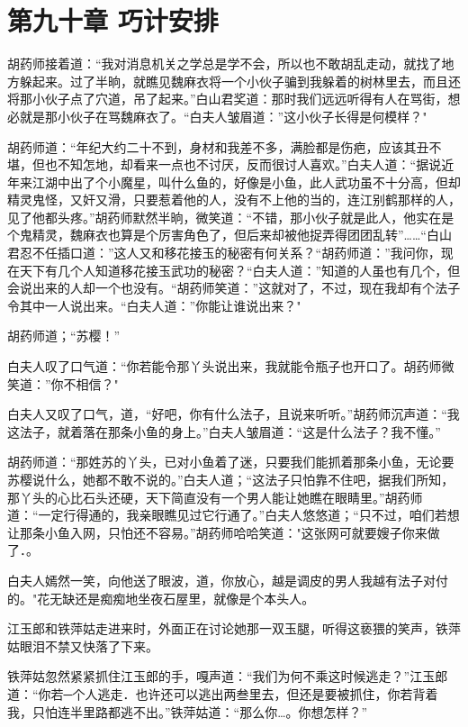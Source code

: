 \documentclass[12pt,oneside]{book}
\begin{document}
\hypertarget{ux7b2cux4e5dux5341ux7ae0-ux5de7ux8ba1ux5b89ux6392}{%
\chapter{第九十章
巧计安排}\label{ux7b2cux4e5dux5341ux7ae0-ux5de7ux8ba1ux5b89ux6392}}

胡药师接着道：``我对消息机关之学总是学不会，所以也不敢胡乱走动，就找了地方躲起来。过了半晌，就瞧见魏麻衣将一个小伙子骗到我躲着的树林里去，而且还将那小伙子点了穴道，吊了起来。''白山君奖道：那时我们远远听得有人在骂街，想必就是那小伙子在骂魏麻衣了。``白夫人皱眉道：''这小伙子长得是何模样？"

胡药师道：``年纪大约二十不到，身材和我差不多，满脸都是伤疤，应该其丑不堪，但也不知怎地，却看来一点也不讨厌，反而很讨人喜欢。''白夫人道：``据说近年来江湖中出了个小魔星，叫什么鱼的，好像是小鱼，此人武功虽不十分高，但却精灵鬼怪，又奸又滑，只要惹着他的人，没有不上他的当的，连江别鹤那样的人，见了他都头疼。''胡药师默然半晌，微笑道：``不错，那小伙子就是此人，他实在是个鬼精灵，魏麻衣也算是个厉害角色了，但后来却被他捉弄得团团乱转''\ldots\ldots{}``白山君忍不任插口道：''这人又和移花接玉的秘密有何关系？``胡药师道：''我问你，现在天下有几个人知道移花接玉武功的秘密？``白夫人道：''知道的人虽也有几个，但会说出来的人却一个也没有。``胡药师笑道：''这就对了，不过，现在我却有个法子令其中一人说出来。``白夫人道：''你能让谁说出来？"

胡药师道；``苏樱！''

白夫人叹了口气道：``你若能令那丫头说出来，我就能令瓶子也开口了。胡药师微笑道：''你不相信？"

白夫人又叹了口气，道，``好吧，你有什么法子，且说来听听。''胡药师沉声道：``我这法子，就着落在那条小鱼的身上。''白夫人皱眉道：``这是什么法子？我不懂。''

胡药师道：``那姓苏的丫头，已对小鱼着了迷，只要我们能抓着那条小鱼，无论要苏樱说什么，她都不敢不说的。''白夫人道；``这法子只怕靠不住吧，据我们所知，那丫头的心比石头还硬，天下简直没有一个男人能让她瞧在眼睛里。''胡药师道：``一定行得通的，我亲眼瞧见过它行通了。''白夫人悠悠道；``只不过，咱们若想让那条小鱼入网，只怕还不容易。''胡药师哈哈笑道："这张网可就要嫂子你来做了．。

白夫人嫣然一笑，向他送了眼波，道，你放心，越是调皮的男人我越有法子对付的。"花无缺还是痴痴地坐夜石屋里，就像是个本头人。

江玉郎和铁萍姑走进来时，外面正在讨论她那一双玉腿，听得这亵猥的笑声，铁萍姑眼泪不禁又快落了下来。

铁萍姑忽然紧紧抓住江玉郎的手，嘎声道：``我们为何不乘这时候逃走？''江玉郎道：``你若─个人逃走．也许还可以逃出两叁里去，但还是要被抓住，你若背着我，只怕连半里路都逃不出。''铁萍姑道：``那么你\ldots。你想怎样？''
\end{document}
